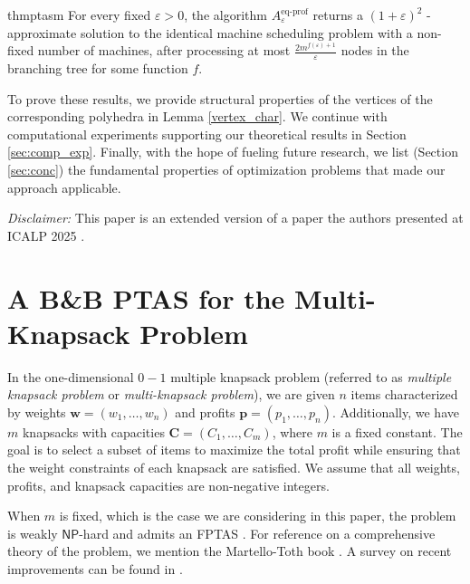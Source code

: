 \documentclass[moor,sglanonrev]{informs4}
\theoremstyle{plain}
\begin{document}
\begin{restatable*}{thm}{ptasm}\label{ptasm}
    For every fixed $\varepsilon > 0$, the algorithm $A^{\text{eq-prof}}_{\varepsilon}$ returns a $(1+\varepsilon)^2$ - approximate solution to the identical machine scheduling problem with a non-fixed number of machines, after processing at most $\frac{2m^{f(\varepsilon)+1}}{\varepsilon}$ nodes in the branching tree for some function $f$.
\end{restatable*}

To prove these results, we provide structural properties of the vertices of the corresponding polyhedra in Lemma \ref{vertex_char}. We continue with computational experiments supporting our theoretical results in Section \ref{sec:comp_exp}. Finally, with the hope of fueling future research, we list (Section \ref{sec:conc}) the fundamental properties of optimization problems that made our approach applicable.

\emph{Disclaimer:} This paper is an extended version of a paper the authors presented at ICALP 2025 \cite{encz_et_al:LIPIcs.ICALP.2025.73}.

\section{A B\&B PTAS for the Multi-Knapsack Problem}\label{sec:knap}

In the one-dimensional $0-1$ multiple knapsack problem (referred to as \emph{multiple knapsack problem} or \emph{multi-knapsack problem}), we are given $n$ items characterized by weights $\bm{w} = (w_1, \ldots, w_n)$ and  profits $\bm{p} = (p_1, \ldots, p_n)$. Additionally, we have \( m \) knapsacks with capacities \( \bm{C} = (C_1, \ldots, C_m) \), where \( m \) is a fixed constant. The goal is to select a subset of items to maximize the total profit while ensuring that the weight constraints of each knapsack are satisfied. We assume that all weights, profits, and knapsack capacities are non-negative integers.

When $m$ is fixed, which is the case we are considering in this paper, the problem is weakly $\textsf{NP}$-hard and admits an FPTAS \cite{ibarra_kim,lawler_fptas}.
For reference on a comprehensive theory of the problem, we mention the Martello-Toth book \cite{martello_toth}. A survey on recent improvements can be found in \cite{survey,MastrolilliH06}. %
\end{document}
